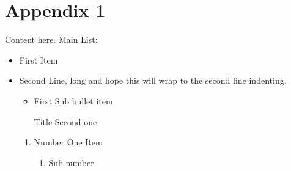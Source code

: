 \documentclass{article}
\begin{document}
\section{Appendix 1}
Content here.
Main List:
\begin{itemize}
    \item First Item
    \item Second Line, long and hope this will wrap to the second line indenting.
    \begin{itemize}
            \item First Sub bullet item
            \item[Title] Second one
    \end{itemize}
    \begin{enumerate}
        \item Number One Item
        \begin{enumerate}
                \item Sub number
        \end{enumerate}
    \end{enumerate}
\end{itemize}
\end{document}
